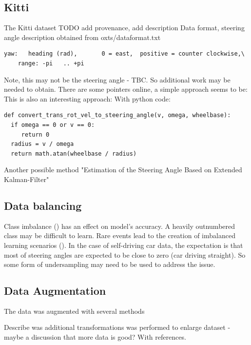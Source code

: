\subsection{Kitti}

The Kitti dataset TODO add provenance, add description
Data format, steering angle description obtained from oxts/dataformat.txt 
\begin{verbatim}
yaw:   heading (rad),       0 = east,  positive = counter clockwise,\
    range: -pi   .. +pi
\end{verbatim}
Note, this may not be the steering angle - TBC. So additional work may be needed to obtain.
There are some pointers online, a simple approach seems to be:
This is also an interesting approach:
With python code:
\begin{verbatim}
def convert_trans_rot_vel_to_steering_angle(v, omega, wheelbase):
  if omega == 0 or v == 0:
     return 0
  radius = v / omega
  return math.atan(wheelbase / radius)    
\end{verbatim}
Another possible method "Estimation of the Steering Angle Based on Extended Kalman-Filter"  

\subsection{Data balancing}

Class imbalance (\cite{batista2004study}) has an effect on model's accuracy. A heavily outnumbered class may be difficult to learn. Rare events lead to the creation of imbalanced learning scenarios (\cite{krawczyk2016learning}). In the case of self-driving car data, the expectation is that most of steering angles are expected to be close to zero (car driving straight). So some form of undersampling may need to be used to address the issue.

\subsection{Data Augmentation}
The data was augmented with several methods

Describe was additional transformations was performed to enlarge dataset - maybe a discussion that more data is good? With references.


